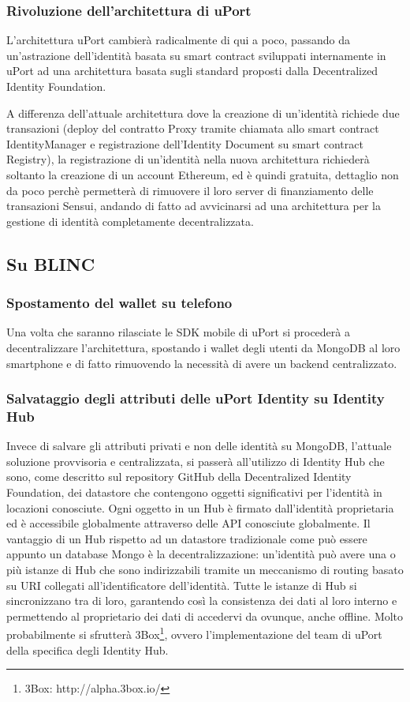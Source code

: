\subsubsection{Rivoluzione dell'architettura di uPort}

L’architettura uPort cambierà radicalmente di qui a poco, passando da un’astrazione
dell’identità basata su smart contract sviluppati internamente in uPort ad una architettura
basata sugli standard proposti dalla Decentralized Identity Foundation.

A differenza dell’attuale architettura dove la creazione di un’identità richiede
due transazioni (deploy del contratto Proxy tramite chiamata allo smart contract IdentityManager
e registrazione dell’Identity Document su smart contract Registry), la registrazione
di un’identità nella nuova architettura richiederà soltanto
la creazione di un account Ethereum, ed è quindi gratuita, dettaglio non da poco perchè
permetterà di rimuovere il loro server di finanziamento delle transazioni Sensui, andando di fatto ad
avvicinarsi ad una architettura per la gestione di identità completamente decentralizzata.

\subsection{Su BLINC}

\subsubsection{Spostamento del wallet su telefono}

Una volta che saranno rilasciate le SDK mobile di uPort si procederà a decentralizzare
l’architettura, spostando i wallet degli utenti da MongoDB al loro smartphone e di fatto
rimuovendo la necessità di avere un backend centralizzato.

\subsubsection{Salvataggio degli attributi delle uPort Identity su Identity Hub}

Invece di salvare gli attributi privati e non delle identità su MongoDB, l’attuale soluzione provvisoria
e centralizzata, si passerà all’utilizzo di Identity Hub che sono, come descritto
sul repository GitHub della Decentralized Identity Foundation, dei datastore che contengono
oggetti significativi per l’identità in locazioni conosciute. Ogni oggetto in un Hub è firmato
dall’identità proprietaria ed è accessibile globalmente attraverso delle API conosciute globalmente.
Il vantaggio di un Hub rispetto ad un datastore tradizionale come può essere appunto un database
Mongo è la decentralizzazione: un’identità può avere una o più istanze di Hub che sono indirizzabili
tramite un meccanismo di routing basato su URI collegati all’identificatore dell’identità.
Tutte le istanze di Hub si sincronizzano tra di loro, garantendo così la consistenza dei dati
al loro interno e permettendo al proprietario dei dati di accedervi da ovunque, anche offline.
Molto probabilmente si sfrutterà 3Box\footnote{3Box: http://alpha.3box.io/},
ovvero l’implementazione del team di uPort della specifica degli Identity Hub.